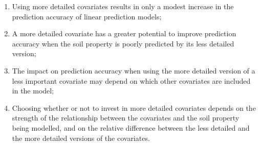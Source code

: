 \begin{enumerate}[label = (\Roman*)]
 \item Using more detailed covariates results in only a modest increase in the prediction accuracy of linear 
 prediction models;
 
 \item A more detailed covariate has a greater potential to improve prediction accuracy when the soil property
 is poorly predicted by its less detailed version;
 
 \item The impact on prediction accuracy when using the more detailed version of a less important covariate 
 may depend on which other covariates are included in the model;
 
 \item Choosing whether or not to invest in more detailed covariates depends on the strength of the 
 relationship between the covariates and the soil property being modelled, and on the relative difference 
 between the less detailed and the more detailed versions of the covariates.
\end{enumerate}
